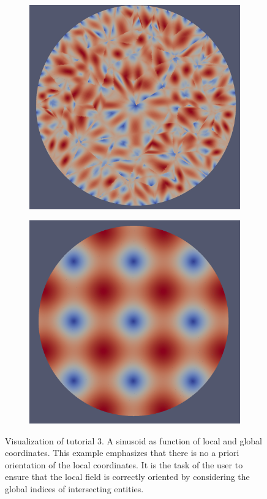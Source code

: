 	
\begin{figure}[H]
	\begin{subfigure}[b]{0.45\textwidth} \hspace{4mm} \includegraphics[scale=0.14]{images/tutorial3-vtk-localsinusoid} \end{subfigure}
	\begin{subfigure}[b]{0.45\textwidth} \hspace{4mm} \includegraphics[scale=0.16]{images/tutorial3-vtk-globalsinusoid} \end{subfigure}
	\caption{ Visualization of tutorial 3. A sinusoid as function of local and global coordinates. This example emphasizes that there is no a priori orientation of the local coordinates. It is the task of the user to ensure that the local field is correctly oriented by considering the global indices of intersecting entities.}
	\label{fig:tutorial3:sinusoid}
\end{figure}


